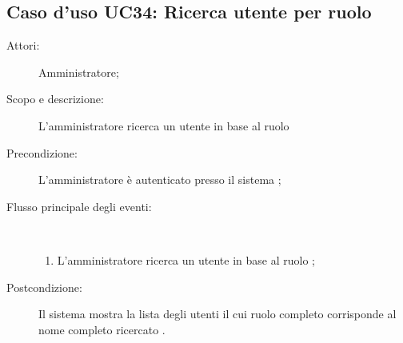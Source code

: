 \subsection{Caso d'uso UC34: Ricerca utente per ruolo}\begin{description}
	\item[Attori:] Amministratore;
	\item[Scopo e descrizione:] L'amministratore ricerca un utente in base al ruolo 
	
	\item[Precondizione:] L'amministratore è autenticato presso il sistema
	;
	
	\item[Flusso principale degli eventi:] \ 
	\begin{enumerate}
		\item L'amministratore ricerca un utente in base al ruolo 
		;
		
	\end{enumerate}
	\item[Postcondizione:] Il sistema mostra la lista degli utenti il cui ruolo completo corrisponde al nome completo ricercato
	.
\end{description}
